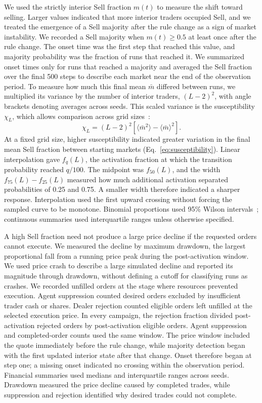 We used the strictly interior Sell fraction $m(t)$ to measure the
shift toward selling. Larger values indicated that more interior
traders occupied Sell, and we treated the emergence of a Sell majority
after the rule change as a sign of market instability.
We recorded a Sell majority when $m(t)\geq0.5$ at least once after the
rule change. The onset time was the first step that reached this value,
and majority probability was the fraction of runs that reached it. We summarized onset times only for
runs that reached a majority and averaged the Sell fraction over the
final 500 steps to describe each market near the end of the observation
period.
To measure how much this final mean $\bar m$ differed between runs,
we multiplied its variance by the number of interior traders,
$(L-2)^2$, with angle brackets denoting averages across seeds. This
scaled variance is the susceptibility $\chi_L$, which allows comparison
across grid sizes~\cite{binder1981finite,landau2021guide}:
\begin{equation}
 \chi_L=(L-2)^2\left[\langle\bar m^2\rangle-
                         \langle\bar m\rangle^2\right].
 \label{eq:susceptibility}
\end{equation}
At a fixed grid size, higher susceptibility indicated greater
variation in the final mean Sell fraction between starting markets
(Eq.~\ref{eq:susceptibility}). Linear
interpolation gave $f_q(L)$, the activation fraction at which the
transition probability reached $q/100$. The midpoint was $f_{50}(L)$,
and the width $f_{75}(L)-f_{25}(L)$ measured how much additional
activation separated probabilities of 0.25 and 0.75. A smaller width
therefore indicated a sharper response.
Interpolation used the first upward crossing without forcing the sampled
curve to be monotone. Binomial proportions used 95\% Wilson
intervals~\cite{wilson1927probable}; continuous summaries used interquartile
ranges unless otherwise specified.

A high Sell fraction need not produce a large price decline if the
requested orders cannot execute. We measured the decline by maximum
drawdown, the largest proportional fall from a running price peak
during the post-activation window. We used price crash to describe a
large simulated decline and reported its magnitude through drawdown,
without defining a cutoff for classifying runs as crashes. We recorded unfilled orders at the
stage where resources prevented execution. Agent suppression counted
desired orders excluded by insufficient trader cash or shares.
Dealer rejection counted eligible orders left unfilled at the selected
execution price. In every campaign, the rejection fraction divided
post-activation rejected orders by post-activation eligible orders.
Agent suppression and completed-order counts used the same window.
The price window included the quote immediately before the rule change,
while majority detection began with the first updated interior state
after that change. Onset therefore began at step one; a missing onset
indicated no crossing within the observation period. Financial summaries used medians
and interquartile ranges across seeds. Drawdown measured the price decline caused by completed trades, while
suppression and rejection identified why desired trades could not
complete.

